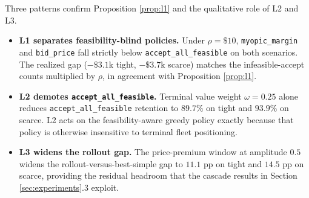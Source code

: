 \documentclass[11pt]{article}
\begin{document}
\begin{table}[t]
\centering
\caption{Layer marginal effects on the calibration-gate policies
(three-seed full-horizon sweeps). Each row varies one layer with the
other layers held at the pre-layer baseline. The gate criterion encodes
the predicted class separation; ``met'' means all policy comparisons in
the criterion pass at the listed parameter value.}
\label{tab:layer-ablation}
\small
{}
\end{table}

Three patterns confirm Proposition \ref{prop:l1} and the qualitative
role of L2 and L3.
\begin{itemize}
  \item \textbf{L1 separates feasibility-blind policies.} Under
  $\rho = \$10$, \texttt{myopic\_margin} and \texttt{bid\_price} fall
  strictly below \texttt{accept\_all\_feasible} on both scenarios. The
  realized gap ($-\$3.1$k tight, $-\$3.7$k scarce) matches the
  infeasible-accept counts multiplied by $\rho$, in agreement with
  Proposition \ref{prop:l1}.
  \item \textbf{L2 demotes \texttt{accept\_all\_feasible}.} Terminal
  value weight $\omega = 0.25$ alone reduces
  \texttt{accept\_all\_feasible} retention to $89.7\%$ on tight and
  $93.9\%$ on scarce. L2 acts on the feasibility-aware greedy policy
  exactly because that policy is otherwise insensitive to terminal
  fleet positioning.
  \item \textbf{L3 widens the rollout gap.} The price-premium window at
  amplitude $0.5$ widens the rollout-versus-best-simple gap to
  $11.1$ pp on tight and $14.5$ pp on scarce, providing the residual
  headroom that the cascade results in
  Section \ref{sec:experiments}.3 exploit.
\end{itemize}
\end{document}
